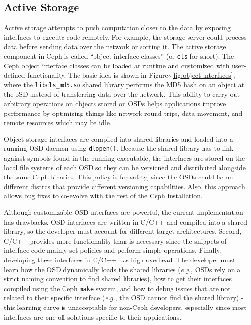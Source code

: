 \documentclass[10pt,twocolumn]{article}
\begin{document}
\subsection{Active Storage}\label{active-storage}

Active storage attempts to push computation closer to the data by
exposing interfaces to execute code remotely. For example, the storage
server could process data before sending data over the network or
sorting it. The active storage component in Ceph is called ``object
interface classes'' (or \texttt{cls} for short). The Ceph object
interface classes can be loaded at runtime and customized with
user-defined functionality. The basic idea is shown in
Figure\textasciitilde{}\ref{fig:object-interfaces}, where the
\texttt{libcls\_md5.so} shared library performs the MD5 hash on an
object at the oSD instead of transferring data over the network. This
ability to carry out arbitrary operations on objects stored on OSDs
helps applications improve performance by optimizing things like network
round trips, data movement, and remote resources which may be idle.

Object storage interfaces are compiled into shared libraries and loaded
into a running OSD daemon using \texttt{dlopen()}. Because the shared
library has to link against symbols found in the running executable, the
interfaces are stored on the local file systems of each OSD so they can
be versioned and distributed alongside the same Ceph binaries. This
policy is for safety, since the OSDs could be on different distros that
provide different versioning capabilities. Also, this approach allows
bug fixes to co-evolve with the rest of the Ceph installation.

Although customizable OSD interfaces are powerful, the current
implementation has drawbacks. OSD interfaces are written in C/C++ and
compiled into a shared library, so the developer must account for
different target architectures. Second, C/C++ provides more
functionality than is necessary since the snippets of interface code
mainly set policies and perform simple operations. Finally, developing
these interfaces in C/C++ has high overhead. The developer must learn
how the OSD dynamically loads the shared libraries (\emph{e.g.}, OSDs
rely on a strict naming convention to find shared libraries), how to get
their interfaces compiled using the Ceph \texttt{make} system, and how
to debug issues that are not related to their specific interface
(\emph{e.g.}, the OSD cannot find the shared library) - this learning
curve is unacceptable for non-Ceph developers, especially since most
interfaces are one-off solutions specific to their applications.
\end{document}
